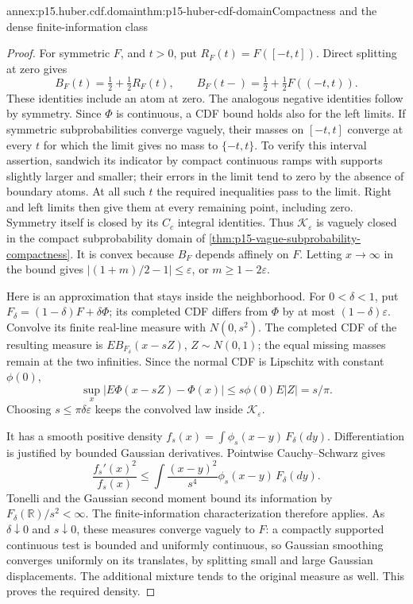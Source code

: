 \begin{annexitem}{annex:p15.huber.cdf.domain}{thm:p15-huber-cdf-domain}{Compactness and the dense finite-information class}
\begin{proof}
For symmetric \(F\), and \(t>0\), put \(R_F(t)=F([-t,t])\).
Direct splitting at zero gives
\[
 B_F(t)=\tfrac12+\tfrac12R_F(t),\qquad
 B_F(t-)=\tfrac12+\tfrac12F((-t,t)).
\]
These identities include an atom at zero. The analogous negative
identities follow by symmetry. Since \(\Phi\) is continuous, a
CDF bound holds also for the left limits.
If symmetric subprobabilities converge vaguely, their masses
on \([-t,t]\) converge at every \(t\) for which the limit gives
no mass to \(\{-t,t\}\). To verify this interval assertion,
sandwich its indicator by compact continuous ramps with supports
slightly larger and smaller; their errors in the limit tend to
zero by the absence of boundary atoms.
At all such \(t\) the required inequalities pass to the limit.
Right and left limits then give them at every remaining point,
including zero. Symmetry itself is closed by its \(C_c\) integral
identities. Thus \(\mathcal K_\varepsilon\) is vaguely closed in
the compact subprobability domain of
\cref{thm:p15-vague-subprobability-compactness}.
It is convex because \(B_F\) depends affinely on \(F\).
Letting \(x\to\infty\) in the bound gives
\(|(1+m)/2-1|\leq\varepsilon\), or \(m\geq1-2\varepsilon\).

Here is an approximation that stays inside the neighborhood.
For \(0<\delta<1\), put \(F_\delta=(1-\delta)F+\delta\Phi\);
its completed CDF differs from \(\Phi\) by at most
\((1-\delta)\varepsilon\).
Convolve its finite real-line measure with \(N(0,s^2)\).
The completed CDF of the resulting measure is
\(E B_{F_\delta}(x-sZ)\), \(Z\sim N(0,1)\); the equal missing
masses remain at the two infinities. Since the normal CDF is
Lipschitz with constant \(\phi(0)\),
\[
 \sup_x|E\Phi(x-sZ)-\Phi(x)|
       \leq s\phi(0)E|Z|=s/\pi .
\]
Choosing \(s\leq\pi\delta\varepsilon\) keeps the convolved law
inside \(\mathcal K_\varepsilon\).

It has a smooth positive density \(f_s(x)=\int\phi_s(x-y)\,F_\delta(dy)\).
Differentiation is justified by bounded Gaussian derivatives.
Pointwise Cauchy--Schwarz gives
\[
 \frac{f_s'(x)^2}{f_s(x)}
 \leq\int\frac{(x-y)^2}{s^4}\phi_s(x-y)\,F_\delta(dy).
\]
Tonelli and the Gaussian second moment bound its information by
\(F_\delta(\mathbb R)/s^2<\infty\).
The finite-information characterization therefore applies.
As \(\delta\downarrow0\) and \(s\downarrow0\), these measures
converge vaguely to \(F\): a compactly supported continuous test
is bounded and uniformly continuous, so Gaussian smoothing
converges uniformly on its translates, by splitting small and
large Gaussian displacements. The additional mixture tends to
the original measure as well. This proves the required density.
\end{proof}
\end{annexitem}

